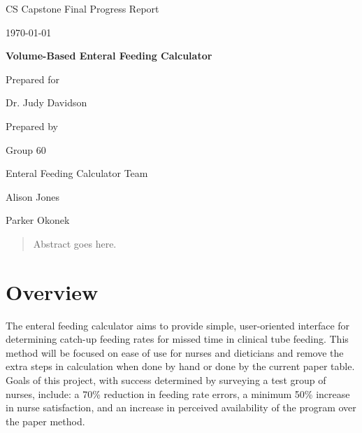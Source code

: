 \documentclass[onecolumn, draftclsnofoot,10pt, compsoc]{IEEEtran}
\def \CapstoneTeamName{		Enteral Feeding Calculator Team}
\def \CapstoneTeamNumber{		60}
\def \GroupMemberOne{			Alison Jones}
\def \GroupMemberTwo{			Parker Okonek}
\def \CapstoneProjectName{		Volume-Based Enteral Feeding Calculator}
\def \CapstoneSponsorPerson{		Dr. Judy Davidson}
\def \DocType{
				Final Progress Report
				}
\newcommand{\NameSigPair}[1]{\par
\makebox[2.75in][r]{#1} \hfil 	\makebox[3.25in]{\makebox[2.25in]{\hrulefill} \hfill		\makebox[.75in]{\hrulefill}}
\par\vspace{-12pt} \textit{\tiny\noindent
\makebox[2.75in]{} \hfil		\makebox[3.25in]{\makebox[2.25in][r]{Signature} \hfill	\makebox[.75in][r]{Date}}}}
\renewcommand{\NameSigPair}[1]{#1}
\begin{document}
\begin{titlepage}
    \begin{singlespace}
        \hfill 
        \par\vspace{.2in}
        \centering
        \scshape{
            \huge CS Capstone \DocType \par
            {\large\today}\par
            \vspace{.5in}
            \textbf{\Huge\CapstoneProjectName}\par
            \vfill
            {\large Prepared for}\par
            {\Large\NameSigPair{\CapstoneSponsorPerson}\par}
            {\large Prepared by }\par
            Group\CapstoneTeamNumber\par
            \CapstoneTeamName\par 
            \vspace{5pt}
            {\Large
                \NameSigPair{\GroupMemberOne}\par
                \NameSigPair{\GroupMemberTwo}\par
            }
            \vspace{20pt}
        }
        \begin{abstract}%
        Abstract goes here.
        \end{abstract}     
    \end{singlespace}
\end{titlepage}
\newpage
{}
\clearpage
\section{Overview}
The enteral feeding calculator aims to provide simple, user-oriented interface for determining catch-up feeding rates for missed time in clinical tube feeding.
This method will be focused on ease of use for nurses and dieticians and remove the extra steps in calculation when done by hand or done by the current paper table.
Goals of this project, with success determined by surveying a test group of nurses, include: a 70\% reduction in feeding rate errors, a minimum 50\% increase in nurse satisfaction, and an increase in perceived availability of the program over the paper method.
\end{document}
